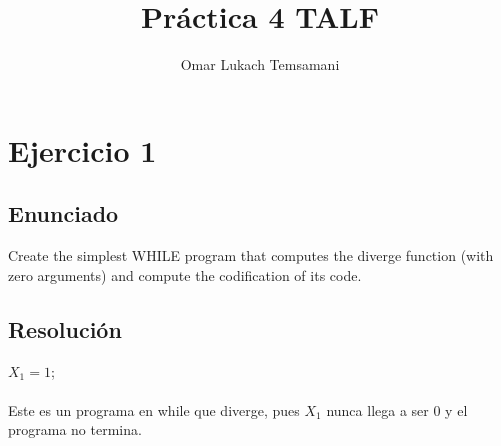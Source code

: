 \documentclass{article}
\title{Práctica 4 TALF}
\author{Omar Lukach Temsamani}
\begin{document}
\maketitle

\section{Ejercicio 1}

\subsection{Enunciado}
Create the simplest WHILE program that computes the diverge function (with
zero arguments) and compute the codification of its code.

\subsection{Resolución}
\newenvironment{whilecode}
\begin{whilecode}
 $X_1=1$; \\
\\
 Este es un programa en while que diverge, pues $X_1$ nunca llega a ser 0 y el programa no termina. 
\end{document}
